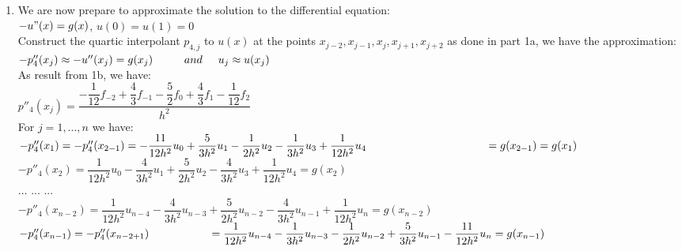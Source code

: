 \documentclass[14pt,a4paper]{article}
\begin{document}
\begin{enumerate}
	\label{1d}
	\item We are now prepare to approximate the solution to the differential equation: \\
	\hspace*{4cm} $-u"(x) = g(x)$, \hspace{1cm} $u(0) = u(1) = 0$\\
	Construct the quartic interpolant $p_{4,j}$ to $u(x)$ at the points $x_{j-2},x_{j-1},x_j,x_{j+1},x_{j+2}$ as done in part 1a, we have the approximation:\\
	\hspace*{2cm} $-p''_4(x_j) \approx -u''(x_j) = g(x_j) \hspace{1cm} and \hspace{0.5cm} u_j \approx u(x_j)$\\
	As result from 1b, we have:\\
	\hspace*{2.7cm} $p''_4(x_j) = \dfrac{-\dfrac{1}{12}f_{-2} + \dfrac{4}{3}f_{-1} - \dfrac{5}{2}f_0 + \dfrac{4}{3}f_1 - \dfrac{1}{12}f_2}{h^2} $\\
	For $j = 1, ..., n$ we have:\\
	$-p''_4(x_1) = -p''_4(x_{2-1}) =  -\dfrac{11}{12h^2}u_0 + \dfrac{5}{3h^2}u_1 - \dfrac{1}{2h^2}u_2 - \dfrac{1}{3h^2}u_3 + \dfrac{1}{12h^2}u_4\\
	\hspace*{3.8cm} = g(x_{2-1}) = g(x_1)$\\
	$-p''_4(x_2) = \dfrac{1}{12h^2}u_0 - \dfrac{4}{3h^2}u_1 + \dfrac{5}{2h^2}u_2 - \dfrac{4}{3h^2}u_3 + \dfrac{1}{12h^2}u_4 = g(x_2)$\\
	\hspace*{0.5cm}   ... ... ...\\
	$-p''_4(x_{n-2}) = \dfrac{1}{12h^2}u_{n-4} - \dfrac{4}{3h^2}u_{n-3} + \dfrac{5}{2h^2}u_{n-2} - \dfrac{4}{3h^2}u_{n-1} + \dfrac{1}{12h^2}u_n = g(x_{n-2})$\\
	$-p''_4(x_{n-1}) = -p''_4(x_{n-2+1}) \\
	\hspace*{1.9cm} = \dfrac{1}{12h^2}u_{n-4} - \dfrac{1}{3h^2}u_{n-3} - \dfrac{1}{2h^2}u_{n-2} + \dfrac{5}{3h^2}u_{n-1} - \dfrac{11}{12h^2}u_n = g(x_{n-1})$\\
	

\end{enumerate}
\end{document}
